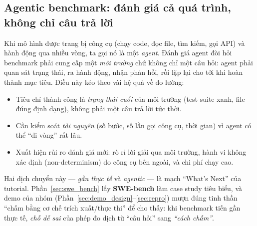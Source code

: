 \subsection{Agentic benchmark: đánh giá cả quá trình, không chỉ câu trả lời}

Khi mô hình được trang bị công cụ (chạy code, đọc file, tìm kiếm, gọi API) và
hành động qua nhiều vòng, ta gọi nó là một \emph{agent}. Đánh giá agent đòi hỏi
benchmark phải cung cấp một \emph{môi trường} chứ không chỉ một câu hỏi: agent
phải quan sát trạng thái, ra hành động, nhận phản hồi, rồi lặp lại cho tới khi
hoàn thành mục tiêu. Điều này kéo theo vài hệ quả về đo lường:

\begin{itemize}
  \item Tiêu chí thành công là \emph{trạng thái cuối} của môi trường (test
    suite xanh, file đúng định dạng), không phải một câu trả lời tức thời.
  \item Cần kiểm soát \emph{tài nguyên} (số bước, số lần gọi công cụ, thời gian)
    vì agent có thể ``đi vòng'' rất lâu.
  \item Xuất hiện rủi ro đánh giá mới: rò rỉ lời giải qua môi trường, hành vi
    không xác định (non-determinism) do công cụ bên ngoài, và chi phí chạy cao.
\end{itemize}

Hai dịch chuyển này --- \emph{gần thực tế} và \emph{agentic} --- là mạch ``What's
Next'' của tutorial. Phần~\ref{sec:swe_bench} lấy \textbf{SWE-bench} làm case study
tiêu biểu, và demo của nhóm (Phần~\ref{sec:demo_design}--\ref{sec:repro})
mượn đúng tinh thần ``chấm bằng cơ chế trích xuất/thực thi'' để cho thấy: khi
benchmark tiến gần thực tế, \emph{chỗ dễ sai} của phép đo dịch từ ``câu hỏi'' sang
\emph{``cách chấm''}.
